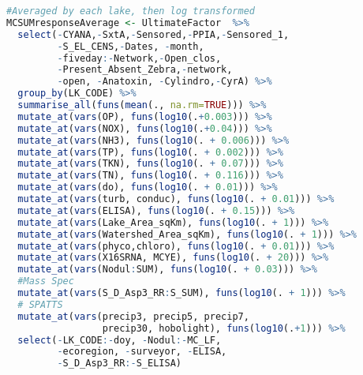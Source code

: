 \begin{lstlisting}[language=R, basicstyle=\small\ttfamily]
#Averaged by each lake, then log transformed
MCSUMresponseAverage <- UltimateFactor  %>%
  select(-CYANA,-SxtA,-Sensored,-PPIA,-Sensored_1,
         -S_EL_CENS,-Dates, -month,
         -fiveday:-Network,-Open_clos,
         -Present_Absent_Zebra,-network,
         -open, -Anatoxin, -Cylindro,-CyrA) %>%
  group_by(LK_CODE) %>%
  summarise_all(funs(mean(., na.rm=TRUE))) %>%
  mutate_at(vars(OP), funs(log10(.+0.003))) %>%
  mutate_at(vars(NOX), funs(log10(.+0.04))) %>%
  mutate_at(vars(NH3), funs(log10(. + 0.006))) %>%
  mutate_at(vars(TP), funs(log10(. + 0.002))) %>%
  mutate_at(vars(TKN), funs(log10(. + 0.07))) %>%
  mutate_at(vars(TN), funs(log10(. + 0.116))) %>%
  mutate_at(vars(do), funs(log10(. + 0.01))) %>%
  mutate_at(vars(turb, conduc), funs(log10(. + 0.01))) %>%
  mutate_at(vars(ELISA), funs(log10(. + 0.15))) %>%
  mutate_at(vars(Lake_Area_sqKm), funs(log10(. + 1))) %>%
  mutate_at(vars(Watershed_Area_sqKm), funs(log10(. + 1))) %>%
  mutate_at(vars(phyco,chloro), funs(log10(. + 0.01))) %>%
  mutate_at(vars(X16SRNA, MCYE), funs(log10(. + 20))) %>%
  mutate_at(vars(Nodul:SUM), funs(log10(. + 0.03))) %>%
  #Mass Spec
  mutate_at(vars(S_D_Asp3_RR:S_SUM), funs(log10(. + 1))) %>%
  # SPATTS
  mutate_at(vars(precip3, precip5, precip7,
                 precip30, hobolight), funs(log10(.+1))) %>%
  select(-LK_CODE:-doy, -Nodul:-MC_LF,
         -ecoregion, -surveyor, -ELISA,
         -S_D_Asp3_RR:-S_ELISA)
\end{lstlisting}
